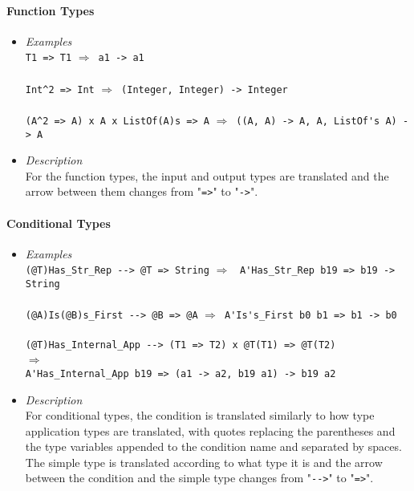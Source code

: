\documentclass[diploma]{softlab-thesis}
\def\lra{$\Longrightarrow$\ }
\begin{document}
\newpage
\paragraph{Function Types}

\begin{itemize}
\item
\textit{Examples}\\

\verb|T1 => T1| \lra \verb|a1 -> a1|\\\\
\verb|Int^2 => Int| \lra \verb|(Integer, Integer) -> Integer|\\\\
\verb|(A^2 => A) x A x ListOf(A)s => A|
\lra \verb|((A, A) -> A, A, ListOf's A) -> A|\\

\item
\textit{Description}\\

For the function types, the input and output types are translated and
the arrow between them changes from "\verb|=>|" to "\verb|->|".

\end{itemize}

\paragraph{Conditional Types}

\begin{itemize}
\item
\textit{Examples}\\

\verb|(@T)Has_Str_Rep --> @T => String|
\lra
\verb|A'Has_Str_Rep b19 => b19 -> String|\\\\
\verb|(@A)Is(@B)s_First --> @B => @A|
\lra \verb|A'Is's_First b0 b1 => b1 -> b0|\\\\
\verb|(@T)Has_Internal_App --> (T1 => T2) x @T(T1) => @T(T2)|
\\
\lra
\\
\verb|A'Has_Internal_App b19 => (a1 -> a2, b19 a1) -> b19 a2|\\

\item
\textit{Description}\\

For conditional types, the condition is translated similarly to how type
application types are translated, with quotes replacing the parentheses and
the type variables appended to the condition name and separated by spaces.
The simple type is translated according to what type it is and
the arrow between the condition and the simple type changes from "\verb|-->|"
to "\verb|=>|".

\end{itemize}
\end{document}
